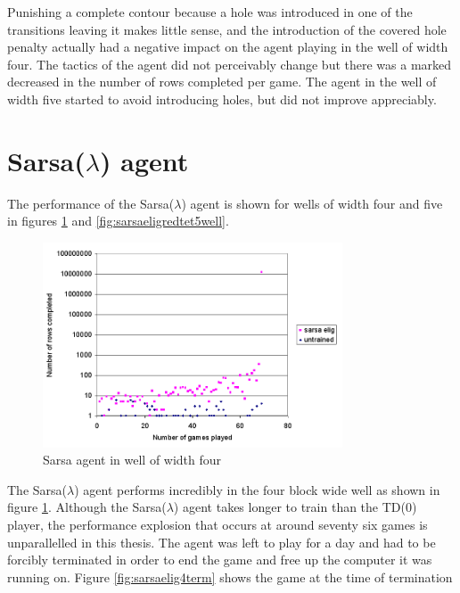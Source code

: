 \documentclass{rucsthesis}
\begin{document}
Punishing a complete contour because a hole was introduced in one of the transitions leaving it makes little sense, and the introduction of the covered hole penalty actually had a negative impact on the agent playing in the well of width four. The tactics of the agent did not perceivably change but there was a marked decreased in the number of rows completed per game. The agent in the well of width five started to avoid introducing holes, but did not improve appreciably.

\section{Sarsa($\lambda$) agent}

The performance of the Sarsa($\lambda$) agent is shown for wells of width four and five in figures \ref{fig:sarsaeligredtet4well} and \ref{fig:sarsaeligredtet5well}.

\begin{figure}[h]
\centering
\includegraphics[width=3.5in]{sarsaeligredtet4well.png}
\caption{Sarsa agent in well of width four}
\label{fig:sarsaeligredtet4well}
\end{figure}

The Sarsa($\lambda$) agent performs incredibly in the four block wide well as shown in figure \ref{fig:sarsaeligredtet4well}. Although the Sarsa($\lambda$) agent takes longer to train than the TD(0) player, the performance explosion that occurs at around seventy six games is unparallelled in this thesis. The agent was left to play for a day and had to be forcibly terminated in order to end the game and free up the computer it was running on. Figure \ref{fig:sarsaelig4term} shows the game at the time of termination 
\end{document}
